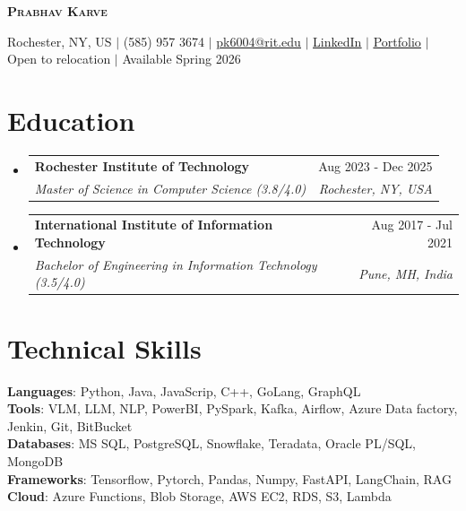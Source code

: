 \documentclass[letterpaper,10.5pt]{article}
\makeatletter
\newcommand{\resumeSubheading}[4]{
  \vspace{-2pt}\item
    \begin{tabular*}{0.97\textwidth}[t]{l@{\extracolsep{\fill}}r}
      \textbf{#1} & #2 \\
      \textit{\small#3} & \textit{\small #4} \\
    \end{tabular*}
}
\newcommand{\resumeSubHeadingListStart}{\begin{itemize}[leftmargin=0.15in, label={}]}
\newcommand{\resumeSubHeadingListEnd}{\end{itemize}}
\makeatother
\begin{document}
\begin{center}
\vspace{-20pt}
    \textbf{\Large \scshape Prabhav Karve} \\ \vspace{1pt}

    \small {Rochester, NY, US} $|$ (585) 957 3674 $|$ \href{mailto:pk6004@g.rit.edu}{{\underline{pk6004@rit.edu}}} $|$
    \href{https://www.linkedin.com/in/prabhav-karve-11300a145/}{\underline{LinkedIn}} $|$
    \href{https://prabhav-karve-portfolio2-0.vercel.app/}{\underline{Portfolio}} $|$
    {Open to relocation }$|$
    {Available Spring 2026}
\vspace{-3pt}
\end{center}


\section{Education}
  \resumeSubHeadingListStart
    \resumeSubheading
      {Rochester Institute of Technology}{Aug 2023 - Dec 2025}
      {Master of Science in Computer Science (3.8/4.0)}{Rochester, NY, USA}
      {}
      \vspace{-5pt}
    \resumeSubheading
       {International Institute of Information Technology }{Aug 2017 - Jul 2021}
      {Bachelor of Engineering in Information Technology (3.5/4.0)}{Pune, MH, India}
      {}
  \resumeSubHeadingListEnd



\section{Technical Skills}
 \begin{itemize}[leftmargin=0.15in, label={}]
    \small{\item{
     \textbf{Languages}{: Python, Java, JavaScrip, C++, GoLang, GraphQL} \\
     \textbf{Tools}{:  VLM, LLM, NLP, PowerBI, PySpark, Kafka, Airflow, Azure Data factory, Jenkin, Git, BitBucket} \\
     \textbf{Databases}{: MS SQL, PostgreSQL, Snowflake, Teradata, Oracle PL/SQL, MongoDB}\\
     \textbf{Frameworks}{: Tensorflow, Pytorch, Pandas, Numpy,  FastAPI, LangChain, RAG } \\
     \textbf{Cloud}{: Azure Functions, Blob Storage, AWS EC2, RDS, S3, Lambda}
    }}
 \end{itemize}
\end{document}
